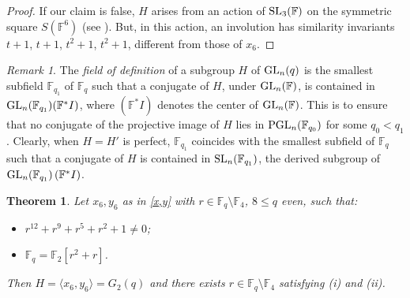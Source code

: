 \documentclass{amsart}
\newtheorem{theorem}[lemma]{Theorem}
\theoremstyle{remark}
\newtheorem{rem}[lemma]{Remark}
\begin{document}
\begin{proof}
If our claim is false,  $H$ arises from an action of ${\mathop{\rm SL}\nolimits}_3({\mathbb{F}})$ 
on the symmetric square $S({\mathbb{F}}^6)$ (see \cite[5.4.11]{KL}). But, in this action, an involution has similarity invariants $t+1$, $t+1$, $t^2+1$, $t^2+1$,
different from those of $x_6$.
\end{proof}

\begin{rem}\label{F1} 
The \emph{field of definition} of a subgroup $H$ of ${\mathop{\rm GL}\nolimits}_n(q)$  is the smallest subfield ${\mathbb{F}}_{q_1}$
of ${\mathbb{F}}_q$ such that a conjugate of $H$, under ${\mathop{\rm GL}\nolimits}_n({\mathbb{F}})$, is contained in ${\mathop{\rm GL}\nolimits}_n({\mathbb{F}}_{q_1})({\mathbb{F}}^\ast I)$, where $({\mathbb{F}}^\ast I)$ denotes the center of ${\mathop{\rm GL}\nolimits}_n({\mathbb{F}})$. This is to ensure that no conjugate of the projective image of $H$ lies in ${\mathop{\rm PGL}\nolimits}_n({\mathbb{F}}_{q_0})$ for some $q_0<q_1$. Clearly, when $H=H'$ is perfect, 
${\mathbb{F}}_{q_1}$ coincides with the smallest subfield of ${\mathbb{F}}_q$ such that a conjugate of $H$ is contained in ${\mathop{\rm SL}\nolimits}_n({\mathbb{F}}_{q_1})$,
the derived subgroup of  ${\mathop{\rm GL}\nolimits}_n({\mathbb{F}}_{q_1})\left({\mathbb{F}}^*I\right)$.
\end{rem}

\begin{theorem}\label{G2Even}
Let $x_6,y_6$ as in \eqref{x,y} with $r\in {\mathbb{F}}_{q}\setminus {\mathbb{F}}_4$, $8\le q$ even, such that:
\begin{itemize}
\item[(i)] $r^{12} + r^9 + r^5 +  r^2 +1\neq 0$;
\item[(ii)] ${\mathbb{F}}_q={\mathbb{F}}_2[ r^2+r]$.
\end{itemize}
Then $H=\langle x_6,y_6\rangle=G_2(q)$ and there exists
$r\in {\mathbb{F}}_{q}\setminus {\mathbb{F}}_4$ satisfying {\rm (i)} and {\rm (ii)}.
\end{theorem}
\end{document}
